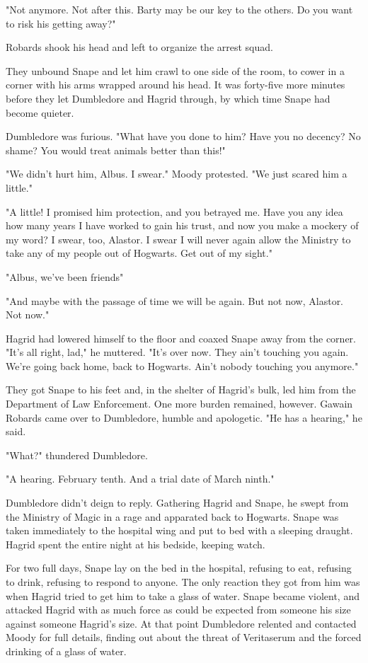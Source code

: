 "Not anymore. Not after this. Barty may be our key to the others. Do you want to risk his getting away?"

Robards shook his head and left to organize the arrest squad.

They unbound Snape and let him crawl to one side of the room, to cower in a corner with his arms wrapped around his head. It was forty-five more minutes before they let Dumbledore and Hagrid through, by which time Snape had become quieter.

Dumbledore was furious. "What have you done to him? Have you no decency? No shame? You would treat animals better than this!"

"We didn't hurt him, Albus. I swear." Moody protested. "We just scared him a little."

"A little! I promised him protection, and you betrayed me. Have you any idea how many years I have worked to gain his trust, and now you make a mockery of my word? I swear, too, Alastor. I swear I will never again allow the Ministry to take any of my people out of Hogwarts. Get out of my sight."

"Albus, we've been friends{\el}"

"And maybe with the passage of time we will be again. But not now, Alastor. Not now."

Hagrid had lowered himself to the floor and coaxed Snape away from the corner. "It's all right, lad," he muttered. "It's over now. They ain't touching you again. We're going back home, back to Hogwarts. Ain't nobody touching you anymore."

They got Snape to his feet and, in the shelter of Hagrid's bulk, led him from the Department of Law Enforcement. One more burden remained, however. Gawain Robards came over to Dumbledore, humble and apologetic. "He has a hearing," he said.

"What?" thundered Dumbledore.

"A hearing. February tenth. And a trial date of March ninth."

Dumbledore didn't deign to reply. Gathering Hagrid and Snape, he swept from the Ministry of Magic in a rage and apparated back to Hogwarts. Snape was taken immediately to the hospital wing and put to bed with a sleeping draught. Hagrid spent the entire night at his bedside, keeping watch.

For two full days, Snape lay on the bed in the hospital, refusing to eat, refusing to drink, refusing to respond to anyone. The only reaction they got from him was when Hagrid tried to get him to take a glass of water. Snape became violent, and attacked Hagrid with as much force as could be expected from someone his size against someone Hagrid's size. At that point Dumbledore relented and contacted Moody for full details, finding out about the threat of Veritaserum and the forced drinking of a glass of water.

